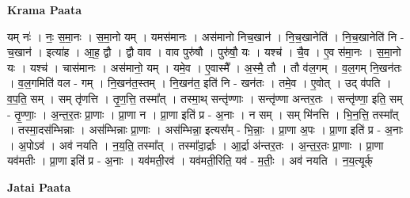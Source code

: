 \documentclass[17pt]{extarticle}
\begin{document}
\textbf{Krama Paata} \newline

यम् नः॑ । नः॒ स॒मा॒नः । स॒मा॒नो यम् । यमस॑मानः । अस॑मानो निच॒खान॑ । नि॒च॒खानेति॑ । नि॒च॒खानेति॑ नि - च॒खान॑ । इत्या॑ह । आ॒ह॒ द्वौ । द्वौ वाव । वाव पुरु॑षौ । पुरु॑षौ॒ यः । यश्च॑ । चै॒व । ए॒व स॑मा॒नः । स॒मा॒नो यः । यश्च॑ । चास॑मानः । अस॑मानो॒ यम् । यमे॒व । ए॒वास्मै᳚ । अ॒स्मै॒ तौ । तौ व॑ल॒गम् । व॒ल॒गम् नि॒खन॑तः । व॒ल॒गमिति॑ वल - गम् । नि॒खन॑त॒स्तम् । नि॒खन॑त॒ इति॑ नि - खन॑तः । तमे॒व । ए॒वोत् । उद् व॑पति । व॒प॒ति॒ सम् । सम् तृ॑णत्ति । तृ॒ण॒त्ति॒ तस्मा᳚त् । तस्मा॒थ् सन्तृ॑ण्णाः । सन्तृ॑ण्णा अन्तर॒तः । सन्तृ॑ण्णा॒ इति॒ सम् - तृ॒ण्णाः॒ । अ॒न्त॒र॒तः प्रा॒णाः । प्रा॒णा न । प्रा॒णा इति॑ प्र - अ॒नाः । न सम् । सम् भि॑नत्ति । भि॒न॒त्ति॒ तस्मा᳚त् । तस्मा॒दस॑म्भिन्नाः । अस॑म्भिन्नाः प्रा॒णाः । अस॑म्भिन्ना॒ इत्यस᳚म् - भि॒न्नाः॒ । प्रा॒णा अ॒पः । प्रा॒णा इति॑ प्र - अ॒नाः । अ॒पोऽव॑ । अव॑ नयति । न॒य॒ति॒ तस्मा᳚त् । तस्मा᳚दा॒र्द्राः । आ॒र्द्रा अ॑न्तर॒तः । अ॒न्त॒र॒तः प्रा॒णाः । प्रा॒णा यव॑मतीः । प्रा॒णा इति॑ प्र - अ॒नाः । यव॑मती॒रव॑ । यव॑मती॒रिति॒ यव॑ - म॒तीः॒ । अव॑ नयति । न॒य॒त्यूर्क् \newline

\textbf{Jatai Paata} \newline
\end{document}
